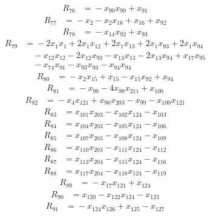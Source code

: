 \begin{align*}
R_{76}&={}-x_{90}x_{90} +x_{91}
\end{align*}
\begin{align*}
R_{77}&={}-x_{2} -x_{2}x_{16} +x_{16} +x_{92}
\end{align*}
\begin{align*}
R_{78}&={}-x_{14}x_{92} +x_{93}
\end{align*}
\begin{align*}
R_{79}&={}-2x_{1}x_{1} +2x_{1}x_{12} +2x_{1}x_{13} +2x_{1}x_{93} +2x_{1}x_{94}\\
&\quad{}-x_{12}x_{12} -2x_{12}x_{93} -x_{13}x_{13} -2x_{13}x_{94} +x_{17}x_{95}\\
&\quad{}-x_{74}x_{91} -x_{93}x_{93} -x_{94}x_{94}
\end{align*}
\begin{align*}
R_{80}&={}-x_{2}x_{15} +x_{15} -x_{15}x_{92} +x_{94}
\end{align*}
\begin{align*}
R_{81}&={}-x_{98} -4x_{98}x_{211} +x_{100}
\end{align*}
\begin{align*}
R_{82}&={}-x_{4}x_{121} +x_{96}x_{203} -x_{99} -x_{100}x_{121}
\end{align*}
\begin{align*}
R_{83}&={}x_{101}x_{203} -x_{102}x_{124} -x_{103}
\end{align*}
\begin{align*}
R_{84}&={}x_{104}x_{203} -x_{105}x_{124} -x_{106}
\end{align*}
\begin{align*}
R_{85}&={}x_{107}x_{203} -x_{108}x_{124} -x_{109}
\end{align*}
\begin{align*}
R_{86}&={}x_{110}x_{203} -x_{111}x_{124} -x_{112}
\end{align*}
\begin{align*}
R_{87}&={}x_{113}x_{204} -x_{115}x_{124} -x_{116}
\end{align*}
\begin{align*}
R_{88}&={}x_{117}x_{204} -x_{118}x_{124} -x_{119}
\end{align*}
\begin{align*}
R_{89}&={}-x_{17}x_{121} +x_{124}
\end{align*}
\begin{align*}
R_{90}&={}x_{120} -x_{122}x_{124} -x_{123}
\end{align*}
\begin{align*}
R_{91}&={}-x_{124}x_{126} +x_{125} -x_{127}
\end{align*}
